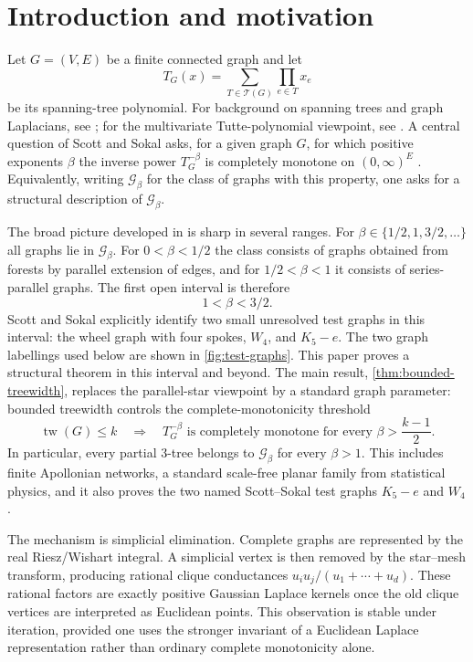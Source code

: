 \documentclass[preprint,12pt,authoryear]{elsarticle}
\numberwithin{equation}{section}
\theoremstyle{definition}
\theoremstyle{remark}
\newcommand{\calG}{\mathcal{G}}
\newcommand{\calT}{\mathcal{T}}
\newcommand{\1}{\mathbf{1}}
\newcommand{\tw}{\operatorname{tw}}
\begin{document}
\medskip

\section{Introduction and motivation}

Let $G=(V,E)$ be a finite connected graph and let
\begin{equation}
    T_G(x)=\sum_{T\in\calT(G)}\prod_{e\in T}x_e
\end{equation}
be its spanning-tree polynomial.  For background on spanning trees and graph Laplacians, see \cite{Bollobas1998,Bapat2010}; for the multivariate Tutte-polynomial viewpoint, see \cite{SokalTutte}.  A central question of Scott and Sokal asks, for a given graph $G$, for which positive exponents $\beta$ the inverse power $T_G^{-\beta}$ is completely monotone on $(0,\infty)^E$ \cite{ScottSokal2014}.  Equivalently, writing $\calG_\beta$ for the class of graphs with this property, one asks for a structural description of $\calG_\beta$.

The broad picture developed in \cite{ScottSokal2014} is sharp in several ranges.  For $\beta\in\{1/2,1,3/2,\ldots\}$ all graphs lie in $\calG_\beta$.  For $0<\beta<1/2$ the class consists of graphs obtained from forests by parallel extension of edges, and for $1/2<\beta<1$ it consists of series-parallel graphs.  The first open interval is therefore
\begin{equation}
        1<\beta<3/2.
\end{equation}
Scott and Sokal explicitly identify two small unresolved test graphs in this interval: the wheel graph with four spokes, $W_4$, and $K_5-e$.
The two graph labellings used below are shown in \cref{fig:test-graphs}.
This paper proves a structural theorem in this interval and beyond.  The main result, \cref{thm:bounded-treewidth}, replaces the parallel-star viewpoint by a standard graph parameter: bounded treewidth controls the complete-monotonicity threshold
\begin{equation}
        \tw(G)\le k
        \quad\Longrightarrow\quad
        T_G^{-\beta}\text{ is completely monotone for every }
        \beta>\frac{k-1}{2}.
\end{equation}
In particular, every partial \(3\)-tree belongs to \(\calG_\beta\) for every \(\beta>1\).  This includes finite Apollonian networks, a standard scale-free planar family from statistical physics, and it also proves the two named Scott--Sokal test graphs \(K_5-e\) and \(W_4\).

The mechanism is simplicial elimination.  Complete graphs are represented by the real Riesz/Wishart integral.  A simplicial vertex is then removed by the star--mesh transform, producing rational clique conductances \(u_i u_j/(u_1+\cdots+u_d)\).  These rational factors are exactly positive Gaussian Laplace kernels once the old clique vertices are interpreted as Euclidean points.  This observation is stable under iteration, provided one uses the stronger invariant of a Euclidean Laplace representation rather than ordinary complete monotonicity alone.
\end{document}
